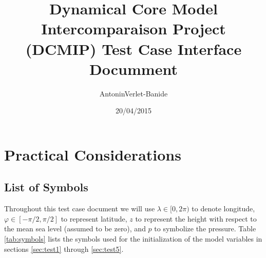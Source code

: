 \documentclass{article}
\title{Dynamical Core Model Intercomparaison Project (DCMIP) Test Case Interface Documment}                  %
\author{AntoninVerlet-Banide}                          %
\date{20/04/2015}                              %
\begin{document}
\maketitle{}                                   %


\section{Practical Considerations}

\subsection{List of Symbols}
Throughout this test case document we will use $\lambda \in [0, 2 \pi)$ to denote longitude, $\varphi \in [-\pi/2, \pi/2]$ to represent latitude, $z$ to represent the height with respect to the mean sea level (assumed to be zero), and $p$ to symbolize the pressure. Table \ref{tab:symbols} lists the symbols used for the initialization of the model variables in sections \ref{sec:test1} through \ref{sec:test5}. 
\end{document}
